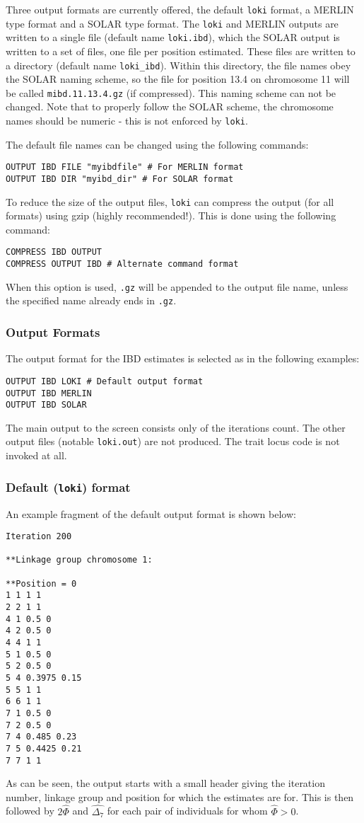 \documentclass[10pt,a4paper]{article}
\newcommand{\Loki}{\texttt{loki}\xspace}
\begin{document}
Three output formats are currently offered, the default \Loki format, a
MERLIN type format and a SOLAR type format.  The \Loki and MERLIN outputs
are written to a single file (default name \verb+loki.ibd+), which the SOLAR
output is written to a set of files, one file per position
estimated.  These files are written to a directory (default name
\verb+loki_ibd+).  Within this directory, the file names obey the SOLAR
naming scheme, so the file for position 13.4 on chromosome 11 will be called
\verb+mibd.11.13.4.gz+ (if compressed).  This naming scheme can not be
changed.  Note that to properly follow the SOLAR scheme, the chromosome
names should be numeric - this is not enforced by \Loki.

The default file names can be changed using the following commands:
\begin{verbatim}
OUTPUT IBD FILE "myibdfile" # For MERLIN format
OUTPUT IBD DIR "myibd_dir" # For SOLAR format
\end{verbatim}

To reduce the size of the output files, \Loki can compress the output (for
all formats) using gzip (highly recommended!).  This is
done using the following command:
\begin{verbatim}
COMPRESS IBD OUTPUT
COMPRESS OUTPUT IBD # Alternate command format
\end{verbatim}
When this option is used, \verb+.gz+ will be appended to the output file
name, unless the specified name already ends in \verb+.gz+.

\subsubsection{Output Formats}
The output format for the IBD estimates is selected as in the following
examples:
\begin{verbatim}
OUTPUT IBD LOKI # Default output format
OUTPUT IBD MERLIN
OUTPUT IBD SOLAR
\end{verbatim}

The main output to the screen consists only of the iterations count.  The
other output files (notable \verb+loki.out+) are not produced.  The trait
locus code is not invoked at all.

\subsubsection{Default (\Loki) format}
An example fragment of the default output format is shown below:
\begin{verbatim}
Iteration 200

**Linkage group chromosome 1:

**Position = 0
1 1 1 1
2 2 1 1
4 1 0.5 0
4 2 0.5 0
4 4 1 1
5 1 0.5 0
5 2 0.5 0
5 4 0.3975 0.15
5 5 1 1
6 6 1 1
7 1 0.5 0
7 2 0.5 0
7 4 0.485 0.23
7 5 0.4425 0.21
7 7 1 1
\end{verbatim}
As can be seen, the output starts with a small header giving the iteration
number, linkage group and position for which the estimates are for.  This is
then followed by $2\hat{\Phi}$ and $\hat{\Delta_7}$ for each pair of
individuals for whom $\hat{\Phi}>0$.
\end{document}
